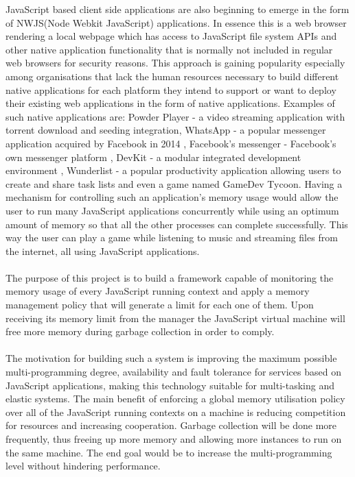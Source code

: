\documentclass{l4proj}
\begin{document}
\hspace*{3em} JavaScript based client side applications are also beginning to emerge in the form of NWJS(Node Webkit JavaScript) applications. In essence this is a web browser rendering a local webpage which has access to JavaScript file system APIs and other native application functionality that is normally not included in regular web browsers for security reasons. This approach is gaining popularity especially among organisations that lack the human resources necessary to build different native applications for each platform they intend to support or want to deploy their existing web applications in the form of native applications. 
Examples of such native applications are: Powder Player - a video streaming application with torrent download and seeding integration\cite{powderplayer}, WhatsApp - a popular messenger application acquired by Facebook in 2014 \cite{whatsap}, Facebook’s messenger - Facebook's own messenger platform \cite{messenger}, DevKit - a modular integrated development environment \cite{devkit},
Wunderlist - a popular productivity application allowing users to create and share task lists\cite{wunderlist} and even a game named GameDev Tycoon\cite{tycoongame}. 
Having a mechanism for controlling such an application's memory usage would allow the user to run many JavaScript applications concurrently while using an optimum amount of memory so that all the other processes can complete successfully. This way the user can play a game while listening to music and streaming files from the internet, all using JavaScript applications.
\\\\%
\hspace*{3em} The purpose of this project is to build a framework capable of monitoring the memory usage of every JavaScript running context and apply a memory management policy that will generate a limit for each one of them. Upon receiving its memory limit from the manager the JavaScript virtual machine will free more memory during garbage collection in order to comply.
\\\\ %
\hspace*{3em} The motivation for building such a system is improving the maximum possible multi-programming degree, availability and fault tolerance for services based on JavaScript applications, making this technology suitable for multi-tasking and elastic systems. The main benefit of enforcing a global memory utilisation policy over all of the JavaScript running contexts on a machine is reducing competition for resources and increasing cooperation. Garbage collection will be done more frequently, thus freeing up more memory and allowing more instances to run on the same machine. The end goal would be to increase the multi-programming level without hindering performance.\\
\end{document}

